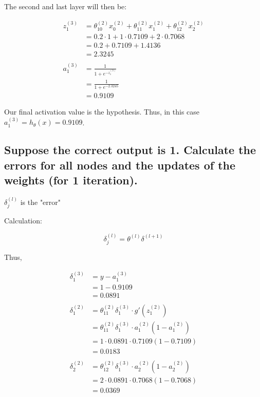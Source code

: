\documentclass{article}
\begin{document}
The second and last layer will then be:

\begin{align*}
z^{(3)}_1 &= \theta_{10}^{(2)}x_0^{(2)} +  \theta_{11}^{(2)}x_1^{(2)} +  \theta_{12}^{(2)}x_2^{(2)} \\
&=0.2 \cdot 1 + 1 \cdot 0.7109 + 2 \cdot 0.7068 \\
&= 0.2 + 0.7109 + 1.4136 \\
&= 2.3245 \\
\\
a^{(3)}_1 &= \frac{1}{1 + e^{-z^{(3)}_1}} \\
&=  \frac{1}{1 + e^{-2.3245}} \\
&= 0.9109
\end{align*}

Our final activation value is the hypothesis. Thus, in this case  $a^{(3)}_1  = h_\theta(x) = 0.9109$. 

\subsection{Suppose the correct output is 1. Calculate the errors for all nodes and the updates of the
weights (for 1 iteration). }



$\delta_j^{(l)}$ is the "error"

Calculation:

\begin{equation*}
\delta_j^{(l)}  = \theta^{(l)} \delta^{(l+1)}
\end{equation*}

Thus,

\begin{align*}
\delta_1^{(3)} &= y - a_1^{(3)} \\
&= 1 - 0.9109 \\
&= 0.0891 \\
\\
\delta_1^{(2)} &= \theta^{(2)}_{11}\delta_1^{(3)}\cdot g'(z_1^{(2)})\\
&=  \theta^{(2)}_{11}\delta_1^{(3)} \cdot a_1^{(2)}(1- a_1^{(2)})\\
&= 1 \cdot 0.0891 \cdot 0.7109 (1 - 0.7109) \\
&= 0.0183 \\
\\
\delta_2^{(2)} &= \theta_{12}^{(2)} \delta_1^{(3)} \cdot a_2^{(2)}(1-a_2^{(2)}) \\
&= 2 \cdot 0.0891 \cdot 0.7068 ( 1 - 0.7068) \\
&= 0.0369
\end{align*}
\end{document}
